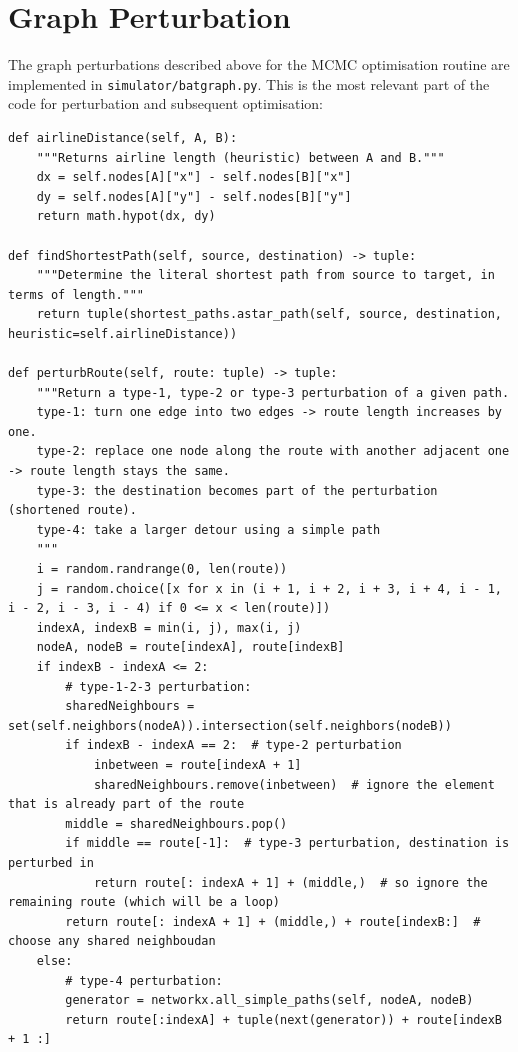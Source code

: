 \documentclass{prettytex/ox/mmsc-special-topic}
\begin{document}
  \section{Graph Perturbation}
  The graph perturbations described above for the MCMC optimisation routine are implemented in \texttt{simulator/batgraph.py}. This is the most relevant part of the code for perturbation and subsequent optimisation:

  \begin{verbatim}
def airlineDistance(self, A, B):
    """Returns airline length (heuristic) between A and B."""
    dx = self.nodes[A]["x"] - self.nodes[B]["x"]
    dy = self.nodes[A]["y"] - self.nodes[B]["y"]
    return math.hypot(dx, dy)

def findShortestPath(self, source, destination) -> tuple:
    """Determine the literal shortest path from source to target, in terms of length."""
    return tuple(shortest_paths.astar_path(self, source, destination, heuristic=self.airlineDistance))

def perturbRoute(self, route: tuple) -> tuple:
    """Return a type-1, type-2 or type-3 perturbation of a given path.
    type-1: turn one edge into two edges -> route length increases by one.
    type-2: replace one node along the route with another adjacent one -> route length stays the same.
    type-3: the destination becomes part of the perturbation (shortened route).
    type-4: take a larger detour using a simple path
    """
    i = random.randrange(0, len(route))
    j = random.choice([x for x in (i + 1, i + 2, i + 3, i + 4, i - 1, i - 2, i - 3, i - 4) if 0 <= x < len(route)])
    indexA, indexB = min(i, j), max(i, j)
    nodeA, nodeB = route[indexA], route[indexB]
    if indexB - indexA <= 2:
        # type-1-2-3 perturbation:
        sharedNeighbours = set(self.neighbors(nodeA)).intersection(self.neighbors(nodeB))
        if indexB - indexA == 2:  # type-2 perturbation
            inbetween = route[indexA + 1]
            sharedNeighbours.remove(inbetween)  # ignore the element that is already part of the route
        middle = sharedNeighbours.pop()
        if middle == route[-1]:  # type-3 perturbation, destination is perturbed in
            return route[: indexA + 1] + (middle,)  # so ignore the remaining route (which will be a loop)
        return route[: indexA + 1] + (middle,) + route[indexB:]  # choose any shared neighboudan
    else:
        # type-4 perturbation:
        generator = networkx.all_simple_paths(self, nodeA, nodeB)
        return route[:indexA] + tuple(next(generator)) + route[indexB + 1 :]
  \end{verbatim}
\end{document}
